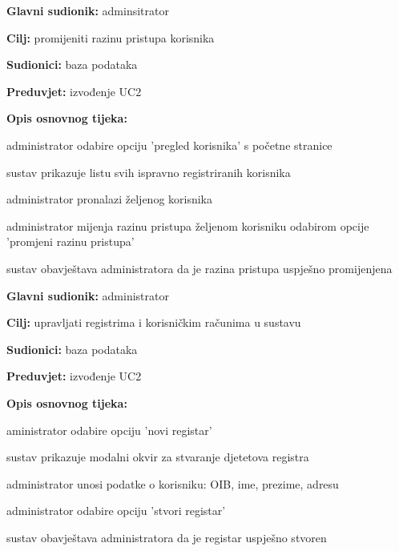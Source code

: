                     \noindent {}
					\begin{packed_item}
	
						\item \textbf{Glavni sudionik: }adminsitrator
						\item  \textbf{Cilj:} promijeniti razinu pristupa korisnika
						\item  \textbf{Sudionici:} baza podataka
						\item  \textbf{Preduvjet:} izvođenje UC2
						\item  \textbf{Opis osnovnog tijeka:}
						
						\item[] \begin{packed_enum}
							\item administrator odabire opciju 'pregled korisnika' s početne stranice
							\item sustav prikazuje listu svih ispravno registriranih korisnika
							\item administrator pronalazi željenog korisnika
							\item administrator mijenja razinu pristupa željenom korisniku odabirom opcije 'promjeni razinu pristupa'
							\item sustav obavještava administratora da je razina pristupa uspješno promijenjena
                        
						\end{packed_enum}
					\end{packed_item}
        
                    \noindent {}
					\begin{packed_item}
	
						\item \textbf{Glavni sudionik: }administrator
						\item  \textbf{Cilj:} upravljati registrima i korisničkim računima u sustavu
						\item  \textbf{Sudionici:} baza podataka
						\item  \textbf{Preduvjet:} izvođenje UC2
						\item  \textbf{Opis osnovnog tijeka:}
						
						\item[] \begin{packed_enum}
	
							\item aministrator odabire opciju 'novi registar'
							\item sustav prikazuje modalni okvir za stvaranje djetetova registra
							\item administrator unosi podatke o korisniku: OIB, ime, prezime, adresu
							\item administrator odabire opciju 'stvori registar'
							\item sustav obavještava administratora da je registar uspješno stvoren

						\end{packed_enum}
						
					\end{packed_item}

